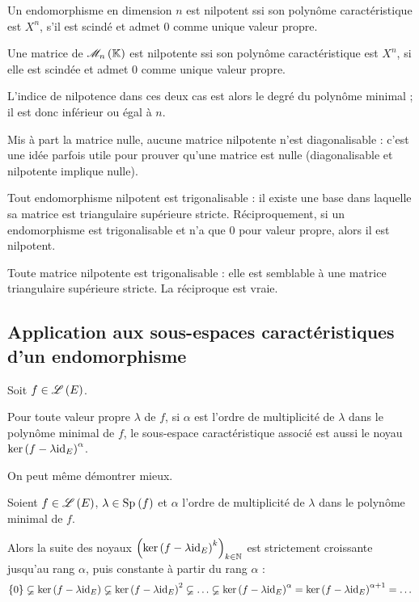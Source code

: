 \begin{prop}
Un endomorphisme en dimension \(n\) est nilpotent ssi son polynôme caractéristique est \(X^n\), \ie s'il est scindé et admet \(0\) comme unique valeur propre.

Une matrice de \(\M{n}\) est nilpotente ssi son polynôme caractéristique est \(X^n\), \ie si elle est scindée et admet \(0\) comme unique valeur propre.

L'indice de nilpotence dans ces deux cas est alors le degré du polynôme minimal ; il est donc inférieur ou égal à \(n\).
\end{prop}

Mis à part la matrice nulle, aucune matrice nilpotente n'est diagonalisable : c'est une idée parfois utile pour prouver qu'une matrice est nulle (diagonalisable et nilpotente implique nulle).

\begin{prop}
Tout endomorphisme nilpotent est trigonalisable : il existe une base dans laquelle sa matrice est triangulaire supérieure stricte. Réciproquement, si un endomorphisme est trigonalisable et n'a que \(0\) pour valeur propre, alors il est nilpotent.

Toute matrice nilpotente est trigonalisable : elle est semblable à une matrice triangulaire supérieure stricte. La réciproque est vraie.
\end{prop}

\subsection{Application aux sous-espaces caractéristiques d'un endomorphisme}

\begin{prop}
Soit \(f\in\mathscr{L}\left(E\right)\).

Pour toute valeur propre \(\lambda\) de \(f\), si \(\alpha\) est l'ordre de multiplicité de \(\lambda\) dans le polynôme minimal de \(f\), le sous-espace caractéristique associé est aussi le noyau \(\ker\left(f-\lambda\mathrm{id}_{E}\right)^\alpha\).
\end{prop}

On peut même démontrer mieux.

\begin{prop}
Soient \(f\in\mathscr{L}\left(E\right)\), \(\lambda\in\Sp{f}\) et \(\alpha\) l'ordre de multiplicité de \(\lambda\) dans le polynôme minimal de \(f\).

Alors la suite des noyaux \(\left(\ker\left(f-\lambda\mathrm{id}_{E}\right)^k\right)_{k\in\mathbb{N}}\) est strictement croissante jusqu'au rang \(\alpha\), puis constante à partir du rang \(\alpha\) : \[\accol{0}\subsetneq\ker\paren{f-\lambda\id{E}}\subsetneq\ker\paren{f-\lambda\id{E}}^2\subsetneq\dots\subsetneq\ker\paren{f-\lambda\id{E}}^\alpha=\ker\paren{f-\lambda\id{E}}^{\alpha+1}=\dots\]
\end{prop}
